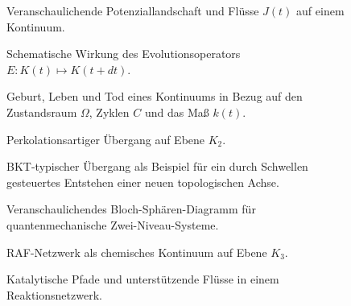\begin{figure}[p]
  \centering
  
  \caption{Veranschaulichende Potenziallandschaft und Flüsse \(J(t)\) auf einem
           Kontinuum.}
  \label{fig:potential-landscape}
\end{figure}

\begin{figure}[p]
  \centering
  
  \caption{Schematische Wirkung des Evolutionsoperators
           \(E : K(t) \mapsto K(t+dt)\).}
  \label{fig:evolution-operator}
\end{figure}

\begin{figure}[p]
  \centering
  
  \caption{Geburt, Leben und Tod eines Kontinuums in Bezug auf den Zustandsraum
           \texorpdfstring{\(\Omega\)}{\Omega}, Zyklen
           \texorpdfstring{\(C\)}{C} und das Maß \(k(t)\).}
  \label{fig:birth-life-death}
\end{figure}

\begin{figure}[p]
  \centering
  
  \caption{Perkolationsartiger Übergang auf Ebene
           \texorpdfstring{\(K_2\)}{K_2}.}
  \label{fig:percolation}
\end{figure}

\begin{figure}[p]
  \centering
  
  \caption{BKT-typischer Übergang als Beispiel für ein durch Schwellen
           gesteuertes Entstehen einer neuen topologischen Achse.}
  \label{fig:bkt-transition}
\end{figure}

\begin{figure}[p]
  \centering
  
  \caption{Veranschaulichendes Bloch-Sphären-Diagramm für quantenmechanische
           Zwei-Niveau-Systeme.}
  \label{fig:bloch-sphere}
\end{figure}

\begin{figure}[p]
  \centering
  
  \caption{RAF-Netzwerk als chemisches Kontinuum auf Ebene
           \texorpdfstring{\(K_3\)}{K_3}.}
  \label{fig:raf-network}
\end{figure}

\begin{figure}[p]
  \centering
  
  \caption{Katalytische Pfade und unterstützende Flüsse in einem
           Reaktionsnetzwerk.}
  \label{fig:catalytic-paths}
\end{figure}


